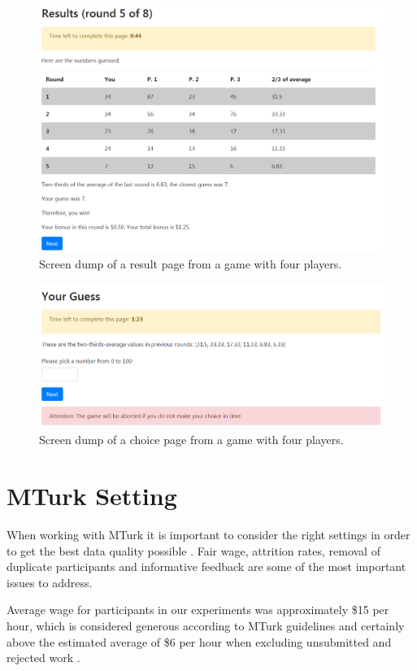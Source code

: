 \begin{figure}
\includegraphics[width=1\textwidth]{../images/FigA3.png}\caption{Screen dump of a result page from a game with four players.}
\label{Fig S3}
\end{figure}

\begin{figure}
\includegraphics[width=1\textwidth]{../images/FigA4.png}\caption{Screen dump of a choice page from a game with four players.}
\label{Fig S4}
\end{figure}

\section{MTurk Setting}
\noindent
When working with MTurk it is important to consider the right settings in order to get the best data quality possible \citep{ChandlerShapiro16}. Fair wage, attrition rates, removal of duplicate participants and informative feedback are some of the most important issues to address.

Average wage for participants in our experiments was approximately \$15 per hour, which is considered generous according to MTurk guidelines and certainly above the estimated average of \$6 per hour when excluding unsubmitted and rejected work \citep{HaraEtAl18}. 

